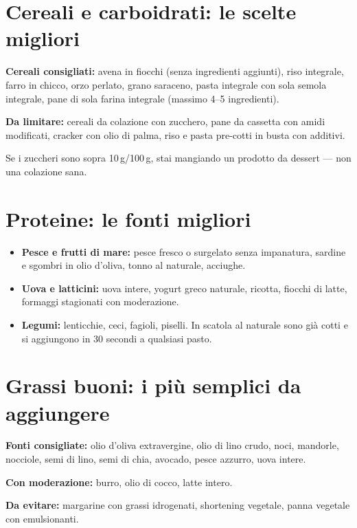 \documentclass[a5paper,12pt,oneside,openany]{book}
\newcommand{\boxinfo}[2]{%
  \begin{tcolorbox}[boxbase,
    colback=blinfo!8!white, colframe=blinfo, title={#1}]
  #2\end{tcolorbox}}
\begin{document}
\section{Cereali e carboidrati: le scelte migliori}

\textbf{Cereali consigliati:} avena in fiocchi (senza ingredienti
aggiunti), riso integrale, farro in chicco, orzo perlato, grano saraceno,
pasta integrale con sola semola integrale, pane di sola farina integrale
(massimo 4--5 ingredienti).

\textbf{Da limitare:} cereali da colazione con zucchero, pane da cassetta
con amidi modificati, cracker con olio di palma, riso e pasta pre-cotti
in busta con additivi.

\boxinfo{Tip rapido per i cereali da colazione}{Se i zuccheri sono sopra
10\,g/100\,g, stai mangiando un prodotto da dessert --- non una colazione
sana.}

\section{Proteine: le fonti migliori}

\begin{itemize}
  \item \textbf{Pesce e frutti di mare:} pesce fresco o surgelato senza
    impanatura, sardine e sgombri in olio d'oliva, tonno al naturale,
    acciughe.
  \item \textbf{Uova e latticini:} uova intere, yogurt greco naturale,
    ricotta, fiocchi di latte, formaggi stagionati con moderazione.
  \item \textbf{Legumi:} lenticchie, ceci, fagioli, piselli. In scatola
    al naturale sono già cotti e si aggiungono in 30 secondi a qualsiasi
    pasto.
\end{itemize}

\section{Grassi buoni: i più semplici da aggiungere}

\textbf{Fonti consigliate:} olio d'oliva extravergine, olio di lino crudo,
noci, mandorle, nocciole, semi di lino, semi di chia, avocado, pesce
azzurro, uova intere.

\textbf{Con moderazione:} burro, olio di cocco, latte intero.

\textbf{Da evitare:} margarine con grassi idrogenati, shortening vegetale,
panna vegetale con emulsionanti.
\end{document}
